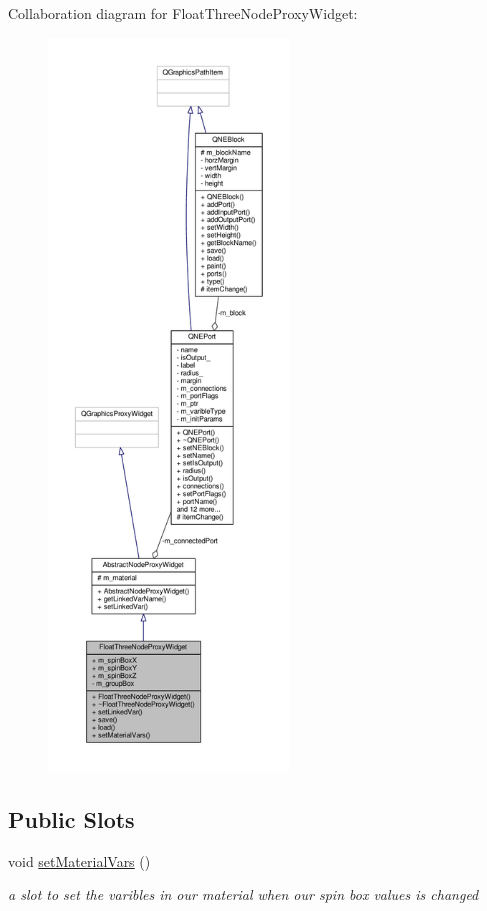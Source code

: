 Collaboration diagram for Float\-Three\-Node\-Proxy\-Widget\-:
\nopagebreak
\begin{figure}[H]
\begin{center}
\leavevmode
\includegraphics[height=550pt]{class_float_three_node_proxy_widget__coll__graph}
\end{center}
\end{figure}
\subsection*{Public Slots}
\begin{DoxyCompactItemize}
\item 
\hypertarget{class_float_three_node_proxy_widget_afee8481ba8a495ad843429f99b561ecb}{void \hyperlink{class_float_three_node_proxy_widget_afee8481ba8a495ad843429f99b561ecb}{set\-Material\-Vars} ()}\label{class_float_three_node_proxy_widget_afee8481ba8a495ad843429f99b561ecb}

\begin{DoxyCompactList}\small\item\em a slot to set the varibles in our material when our spin box values is changed \end{DoxyCompactList}\end{DoxyCompactItemize}
